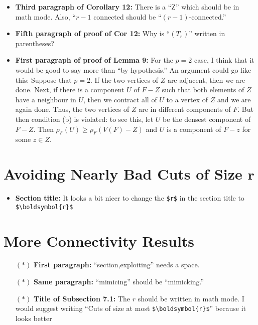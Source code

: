 \documentclass[11 pt]{article}
\theoremstyle{definition}
\theoremstyle{case}
\numberwithin{equation}{section}
\begin{document}
\begin{itemize}
\item \textbf{Third paragraph of Corollary 12:} There is a ``Z'' which should be in math mode. Also, ``$r-1$ connected should be ``$(r-1)$-connected.'' 
\item \textbf{Fifth paragraph of proof of Cor 12:} Why is ``$(T_r)$'' written in parentheses? 
\item \textbf{First paragraph of proof of Lemma 9:} For the $p=2$ case, I think that it would be good to say more than ``by hypothesis.'' An argument could go like this: Suppose that $p=2$. If the two vertices of $Z$ are adjacent, then we are done. Next, if there is a component $U$ of $F-Z$ such that both elements of $Z$ have a neighbour in $U$, then we contract all of $U$ to a vertex of $Z$ and we are again done. Thus, the two vertices of $Z$ are in different components of $F$. But then condition (b) is violated: to see this, let $U$ be the densest component of $F-Z$. Then $\rho_F(U) \geq \rho_F(V(F)-Z)$ and $U$ is a component of $F-z$ for some $z\in Z$. 
\end{itemize}

\section{Avoiding Nearly Bad Cuts of Size $\boldsymbol{r}$}

\begin{itemize}
\item \textbf{Section title:} It looks a bit nicer to change the \texttt{\$r\$} in the section title to \texttt{\$\textbackslash{boldsymbol}\{r\}\$}
\end{itemize}

\section{More Connectivity Results}

\begin{itemize}
\item[$\boldsymbol{(*)}$] \textbf{First paragraph:} ``section,exploiting'' needs a space.
\item[$\boldsymbol{(*)}$] \textbf{Same paragraph:} ``mimicing'' should be ``mimicking.''
\item[$\boldsymbol{(*)}$] \textbf{Title of Subsection 7.1:} The $r$ should be written in math mode. I would suggest writing ``Cuts of size at most \texttt{\$\textbackslash{boldsymbol}\{r\}\$}'' because it looks better
\end{itemize}
\end{document}
